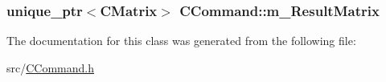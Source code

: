 \subsubsection[{\texorpdfstring{m\+\_\+\+Result\+Matrix}{m_ResultMatrix}}]{\setlength{\rightskip}{0pt plus 5cm}unique\+\_\+ptr$<${\bf C\+Matrix}$>$ C\+Command\+::m\+\_\+\+Result\+Matrix}\hypertarget{classCCommand_a5192105298cdb9ea3ef5c3d3aaeba50e}{}\label{classCCommand_a5192105298cdb9ea3ef5c3d3aaeba50e}


The documentation for this class was generated from the following file\+:\begin{DoxyCompactItemize}
\item 
src/\hyperlink{CCommand_8h}{C\+Command.\+h}\end{DoxyCompactItemize}
